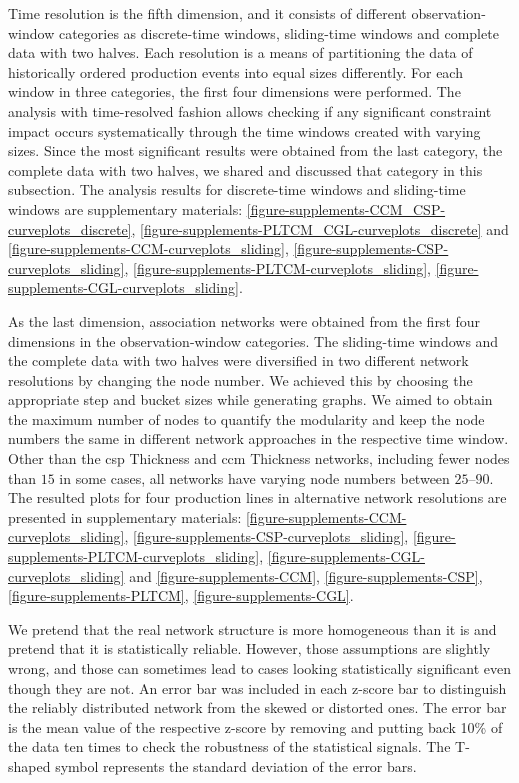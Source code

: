 Time resolution is the fifth dimension, and it consists of different observation-window categories as discrete-time windows, sliding-time windows and complete data with two halves. Each resolution is a means of partitioning the data of historically ordered production events into equal sizes differently. For each window in three categories, the first four dimensions were performed. The analysis with time-resolved fashion allows checking if any significant constraint impact occurs systematically through the time windows created with varying sizes. Since the most significant results were obtained from the last category, the complete data with two halves, we shared and discussed that category in this subsection. The analysis results for discrete-time windows and sliding-time windows are supplementary materials: \ref{figure-supplements-CCM_CSP-curveplots_discrete}, \ref{figure-supplements-PLTCM_CGL-curveplots_discrete} and \ref{figure-supplements-CCM-curveplots_sliding}, \ref{figure-supplements-CSP-curveplots_sliding}, \ref{figure-supplements-PLTCM-curveplots_sliding}, \ref{figure-supplements-CGL-curveplots_sliding}.

As the last dimension, association networks were obtained from the first four dimensions in the observation-window categories. The sliding-time windows and the complete data with two halves were diversified in two different network resolutions by changing the node number. We achieved this by choosing the appropriate step and bucket sizes while generating graphs. We aimed to obtain the maximum number of nodes to quantify the modularity and keep the node numbers the same in different network approaches in the respective time window. Other than the \acs{csp} Thickness and \acs{ccm} Thickness networks, including fewer nodes than $15$ in some cases, all networks have varying node numbers between $25$--$90$. The resulted plots for four production lines in alternative network resolutions are presented in supplementary materials: \ref{figure-supplements-CCM-curveplots_sliding}, \ref{figure-supplements-CSP-curveplots_sliding}, \ref{figure-supplements-PLTCM-curveplots_sliding}, \ref{figure-supplements-CGL-curveplots_sliding} and \ref{figure-supplements-CCM}, \ref{figure-supplements-CSP}, \ref{figure-supplements-PLTCM}, \ref{figure-supplements-CGL}.

We pretend that the real network structure is more homogeneous than it is and pretend that it is statistically reliable. However, those assumptions are slightly wrong, and those can sometimes lead to cases looking statistically significant even though they are not. An error bar was included in each z-score bar to distinguish the reliably distributed network from the skewed or distorted ones. The error bar is the mean value of the respective z-score by removing and putting back 10\% of the data ten times to check the robustness of the statistical signals. The T-shaped symbol represents the standard deviation of the error bars.


